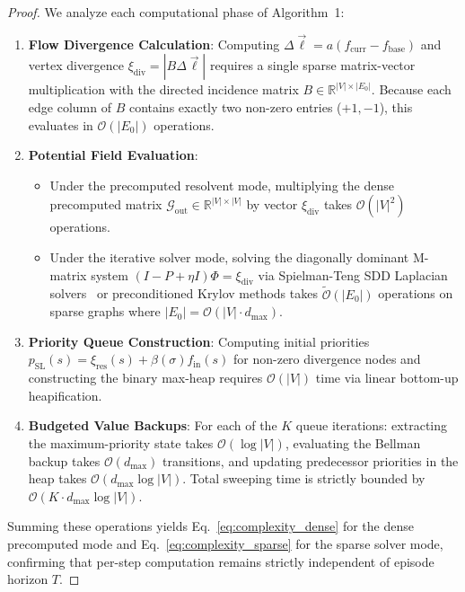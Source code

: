 \documentclass[11pt,a4paper]{article}
\begin{document}
\begin{proof}
We analyze each computational phase of Algorithm~1:
\begin{enumerate}
    \item \textbf{Flow Divergence Calculation}: Computing $\Delta \vec{\ell} = a (f_{\text{curr}} - f_{\text{base}})$ and vertex divergence $\xi_{\text{div}} = |B \Delta \vec{\ell}|$ requires a single sparse matrix-vector multiplication with the directed incidence matrix $B \in \mathbb{R}^{|V| \times |E_0|}$. Because each edge column of $B$ contains exactly two non-zero entries ($+1, -1$), this evaluates in $\mathcal{O}(|E_0|)$ operations.
    \item \textbf{Potential Field Evaluation}: 
    \begin{itemize}
        \item Under the precomputed resolvent mode, multiplying the dense precomputed matrix $\mathcal{G}_{\text{out}} \in \mathbb{R}^{|V| \times |V|}$ by vector $\xi_{\text{div}}$ takes $\mathcal{O}(|V|^2)$ operations.
        \item Under the iterative solver mode, solving the diagonally dominant M-matrix system $(I - P + \eta I)\Phi = \xi_{\text{div}}$ via Spielman-Teng SDD Laplacian solvers~\cite{spielman2025sagt} or preconditioned Krylov methods takes $\widetilde{\mathcal{O}}(|E_0|)$ operations on sparse graphs where $|E_0| = \mathcal{O}(|V| \cdot d_{\max})$.
    \end{itemize}

    \item \textbf{Priority Queue Construction}: Computing initial priorities $p_{\text{SL}}(s) = \xi_{\text{res}}(s) + \beta(\sigma) f_{\text{in}}(s)$ for non-zero divergence nodes and constructing the binary max-heap requires $\mathcal{O}(|V|)$ time via linear bottom-up heapification.
    \item \textbf{Budgeted Value Backups}: For each of the $K$ queue iterations: extracting the maximum-priority state takes $\mathcal{O}(\log |V|)$, evaluating the Bellman backup takes $\mathcal{O}(d_{\max})$ transitions, and updating predecessor priorities in the heap takes $\mathcal{O}(d_{\max} \log |V|)$. Total sweeping time is strictly bounded by $\mathcal{O}(K \cdot d_{\max} \log |V|)$.
\end{enumerate}
Summing these operations yields Eq.~\eqref{eq:complexity_dense} for the dense precomputed mode and Eq.~\eqref{eq:complexity_sparse} for the sparse solver mode, confirming that per-step computation remains strictly independent of episode horizon $T$.
\end{proof}
\end{document}
